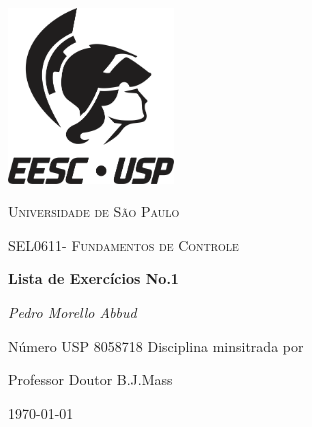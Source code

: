 \documentclass[12pt,a4paper]{article}
\begin{document}
\begin{titlepage}
  \centering
  \includegraphics[width=0.33\textwidth]{usp}\par\vspace{1cm}
  {\scshape\LARGE Universidade de São Paulo\par}
  \vspace{1cm}
  {\scshape\Large SEL0611- Fundamentos de Controle\par}
  \vspace{1.5cm}
  {\huge\bfseries Lista de Exercícios No.1\par}
  \vspace{2cm}
  {\Large\itshape Pedro Morello Abbud \par}
  \vspace{1cm}
  Número USP 8058718
  \vfill
  Disciplina minsitrada por\par
  Professor Doutor B.J.Mass

  \vfill 
  {\large \today\par}
\end{titlepage}
\newpage
\end{document}
